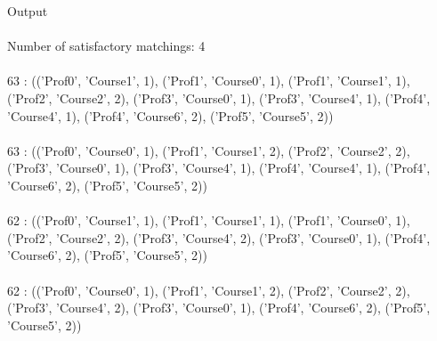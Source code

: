 \begin{enumerate}
    Output \\ \\
    Number of satisfactory matchings: 4 \\ \\
63 : (('Prof0', 'Course1', 1), ('Prof1', 'Course0', 1), ('Prof1', 'Course1', 1), ('Prof2', 'Course2', 2), ('Prof3', 'Course0', 1), ('Prof3', 'Course4', 1), ('Prof4', 'Course4', 1), ('Prof4', 'Course6', 2), ('Prof5', 'Course5', 2)) \\ \\
63 : (('Prof0', 'Course0', 1), ('Prof1', 'Course1', 2), ('Prof2', 'Course2', 2), ('Prof3', 'Course0', 1), ('Prof3', 'Course4', 1), ('Prof4', 'Course4', 1), ('Prof4', 'Course6', 2), ('Prof5', 'Course5', 2)) \\ \\
62 : (('Prof0', 'Course1', 1), ('Prof1', 'Course1', 1), ('Prof1', 'Course0', 1), ('Prof2', 'Course2', 2), ('Prof3', 'Course4', 2), ('Prof3', 'Course0', 1), ('Prof4', 'Course6', 2), ('Prof5', 'Course5', 2)) \\ \\
62 : (('Prof0', 'Course0', 1), ('Prof1', 'Course1', 2), ('Prof2', 'Course2', 2), ('Prof3', 'Course4', 2), ('Prof3', 'Course0', 1), ('Prof4', 'Course6', 2), ('Prof5', 'Course5', 2))

\end{enumerate}

